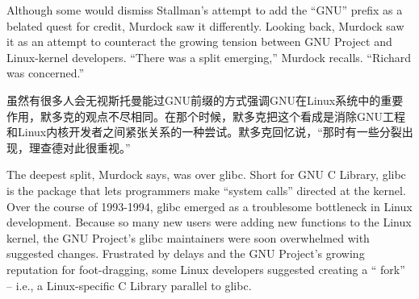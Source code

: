 


\ifdefined\eng
Although some would dismiss Stallman's attempt to add the ``GNU'' prefix as a belated quest for credit, Murdock saw it differently. Looking back, Murdock saw it as an attempt to counteract the growing tension between GNU Project and Linux-kernel developers. ``There was a split emerging,'' Murdock recalls. ``Richard was concerned.''
\fi

\ifdefined\chs
虽然有很多人会无视斯托曼能过GNU前缀的方式强调GNU在Linux系统中的重要作用，默多克的观点不尽相同。在那个时候，默多克把这个看成是消除GNU工程和Linux内核开发者之间紧张关系的一种尝试。默多克回忆说，``那时有一些分裂出现，理查德对此很重视。''
\fi



\ifdefined\eng
The deepest split, Murdock says, was over glibc. Short for GNU C Library, glibc is the package that lets programmers make ``system calls'' directed at the kernel. Over the course of 1993-1994, glibc emerged as a troublesome bottleneck in Linux development. Because so many new users were adding new functions to the Linux kernel, the GNU Project's glibc maintainers were soon overwhelmed with suggested changes. Frustrated by delays and the GNU Project's growing reputation for foot-dragging, some Linux developers suggested creating a `` fork'' -- i.e., a Linux-specific C Library parallel to glibc.
\fi

